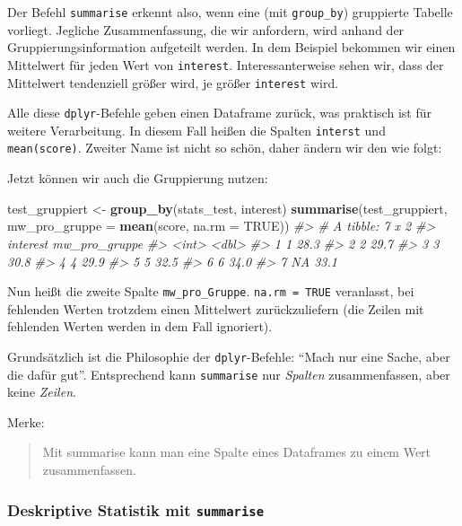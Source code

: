 \documentclass[12pt,ngerman,]{book}
\makeatletter
\newenvironment{Shaded}{\begin{snugshade}}{\end{snugshade}}
\newcommand{\KeywordTok}[1]{\textcolor[rgb]{0.13,0.29,0.53}{\textbf{{#1}}}}
\newcommand{\DataTypeTok}[1]{\textcolor[rgb]{0.13,0.29,0.53}{{#1}}}
\newcommand{\StringTok}[1]{\textcolor[rgb]{0.31,0.60,0.02}{{#1}}}
\newcommand{\CommentTok}[1]{\textcolor[rgb]{0.56,0.35,0.01}{\textit{{#1}}}}
\newcommand{\OtherTok}[1]{\textcolor[rgb]{0.56,0.35,0.01}{{#1}}}
\newcommand{\NormalTok}[1]{{#1}}
\newenvironment{kframe}{%
\medskip{}
\setlength{\fboxsep}{.8em}
 \def\at@end@of@kframe{}%
 \ifinner\ifhmode%
  \def\at@end@of@kframe{\end{minipage}}%
  \begin{minipage}{\columnwidth}%
 \fi\fi%
 \def\FrameCommand##1{\hskip\@totalleftmargin \hskip-\fboxsep
 \colorbox{shadecolor}{##1}\hskip-\fboxsep
     \hskip-\linewidth \hskip-\@totalleftmargin \hskip\columnwidth}%
 \MakeFramed {\advance\hsize-\width
   \@totalleftmargin\z@ \linewidth\hsize
   \@setminipage}}%
 {\par\unskip\endMakeFramed%
 \at@end@of@kframe}
\renewenvironment{Shaded}{\begin{kframe}}{\end{kframe}}
\makeatother
\begin{document}
Der Befehl \texttt{summarise} erkennt also, wenn eine (mit
\texttt{group\_by}) gruppierte Tabelle vorliegt. Jegliche
Zusammenfassung, die wir anfordern, wird anhand der
Gruppierungsinformation aufgeteilt werden. In dem Beispiel bekommen wir
einen Mittelwert für jeden Wert von \texttt{interest}.
Interessanterweise sehen wir, dass der Mittelwert tendenziell größer
wird, je größer \texttt{interest} wird.

Alle diese \texttt{dplyr}-Befehle geben einen Dataframe zurück, was
praktisch ist für weitere Verarbeitung. In diesem Fall heißen die
Spalten \texttt{interst} und \texttt{mean(score)}. Zweiter Name ist
nicht so schön, daher ändern wir den wie folgt:

Jetzt können wir auch die Gruppierung nutzen:

\begin{Shaded}
\begin{Highlighting}[]
\NormalTok{test_gruppiert <-}\StringTok{ }\KeywordTok{group_by}\NormalTok{(stats_test, interest)}
\KeywordTok{summarise}\NormalTok{(test_gruppiert, }\DataTypeTok{mw_pro_gruppe =} \KeywordTok{mean}\NormalTok{(score, }\DataTypeTok{na.rm =} \OtherTok{TRUE}\NormalTok{))}
\CommentTok{#> # A tibble: 7 x 2}
\CommentTok{#>   interest mw_pro_gruppe}
\CommentTok{#>      <int>         <dbl>}
\CommentTok{#> 1        1          28.3}
\CommentTok{#> 2        2          29.7}
\CommentTok{#> 3        3          30.8}
\CommentTok{#> 4        4          29.9}
\CommentTok{#> 5        5          32.5}
\CommentTok{#> 6        6          34.0}
\CommentTok{#> 7       NA          33.1}
\end{Highlighting}
\end{Shaded}

Nun heißt die zweite Spalte \texttt{mw\_pro\_Gruppe}.
\texttt{na.rm\ =\ TRUE} veranlasst, bei fehlenden Werten trotzdem einen
Mittelwert zurückzuliefern (die Zeilen mit fehlenden Werten werden in
dem Fall ignoriert).

Grundsätzlich ist die Philosophie der \texttt{dplyr}-Befehle: ``Mach nur
eine Sache, aber die dafür gut''. Entsprechend kann \texttt{summarise}
nur \emph{Spalten} zusammenfassen, aber keine \emph{Zeilen}.

Merke:

\begin{quote}
Mit summarise kann man eine Spalte eines Dataframes zu einem Wert
zusammenfassen.
\end{quote}

\subsubsection{\texorpdfstring{Deskriptive Statistik mit
\texttt{summarise}}{Deskriptive Statistik mit summarise}}\label{deskriptive-statistik-mit-summarise}
\end{document}
